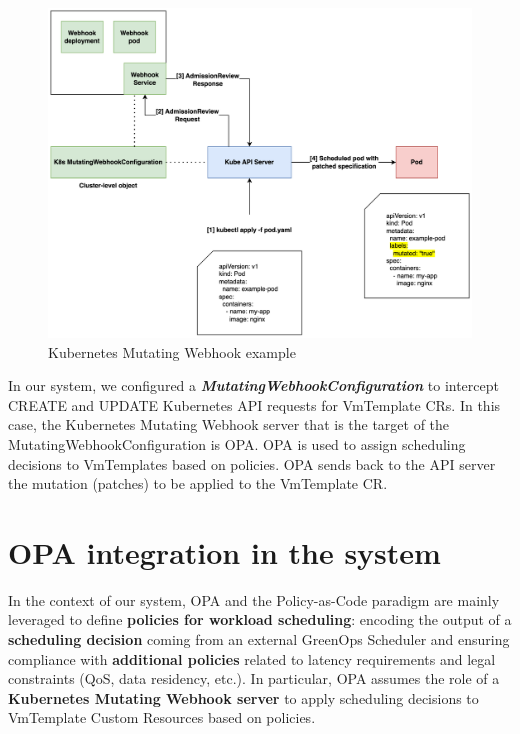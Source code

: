 \begin{figure}[t]
  \centering
  \includegraphics[width=1\linewidth]{images/k8s_webhook_example.png}
  \caption{Kubernetes Mutating Webhook example \cite{kubernetes_mutating_webhook_example}}
  \label{fig:k8s_webhook_example}
\end{figure}

In our system, we configured a \textbf{\textit{MutatingWebhookConfiguration}} to intercept CREATE and UPDATE Kubernetes API requests for VmTemplate CRs.
In this case, the Kubernetes Mutating Webhook server that is the target of the MutatingWebhookConfiguration is OPA.
OPA is used to assign scheduling decisions to VmTemplates based on policies. 
OPA sends back to the API server the mutation (patches) to be applied to the VmTemplate CR.


\section{OPA integration in the system}

In the context of our system, OPA and the Policy-as-Code paradigm are mainly leveraged to define \textbf{policies for workload scheduling}: encoding the output of a \textbf{scheduling decision} coming from an external GreenOps Scheduler and ensuring compliance with \textbf{additional policies} related to latency requirements and legal constraints (QoS, data residency, etc.).
In particular, OPA assumes the role of a \textbf{Kubernetes Mutating Webhook server} to apply scheduling decisions to VmTemplate Custom Resources based on policies.

